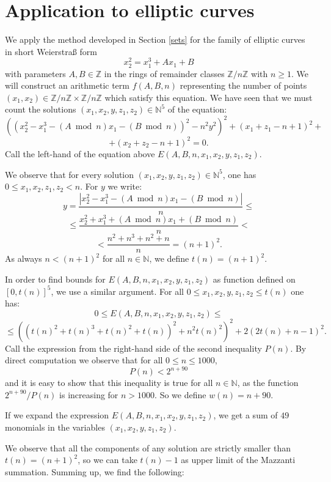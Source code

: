 \documentclass[10pt,a4paper]{article}
\theoremstyle{plain}
\begin{document}
\section{Application to elliptic curves} 

We apply the method developed in Section \ref{sets} for the family of elliptic curves in short Weierstra{\ss } form
$$x_2^2 = x_1^3 + Ax_1 + B$$
with parameters $A, B \in \mathbb Z$ in the rings of remainder classes $\mathbb Z / n \mathbb Z$ with $n \geq 1$. We will construct an arithmetic term $f(A, B, n)$ representing the number of points $(x_1,x_2) \in \mathbb Z / n \mathbb Z \times \mathbb Z / n \mathbb Z$ which satisfy this equation. We have seen that we must count the solutions $(x_1, x_2, y, z_1, z_2) \in \mathbb N^5$ of the equation:
$$\left ( \left (x_2^2 -  x_1^3 - (A \bmod n) x_1 - (B \bmod n) \right )^2 - n^2 y^2\right )^2 + (x_1 + z_1 - n + 1)^2 + $$ $$ + (x_2 + z_2 - n + 1)^2 = 0.$$
Call the left-hand of the equation above $E(A, B, n, x_1, x_2, y, z_1, z_2) $. 

We observe that for every solution $(x_1, x_2, y, z_1, z_2) \in \mathbb N^5$, one has $0 \leq x_1, x_2, z_1, z_2 < n$. For $y$ we write:
$$y = \frac{|x_2^2 - x_1^3 - (A \bmod n) x_1 - (B \bmod n)|}{n}\le $$ $$\le \frac{x_2^2 + x_1^3 + (A \bmod n) x_1 + (B \bmod n)}{n} <$$
$$< \frac{n^2 + n^3 + n^2 + n}{n} = (n+1)^2.$$
As always $n < (n+1)^2$ for all $n \in \mathbb N$, we define $t(n) = (n+1)^2$. 

In order to find bounds for $E(A, B, n, x_1, x_2, y, z_1, z_2) $ as function defined on $[0, t(n)]^5$, we use a similar argument. For all $0 \leq x_1, x_2, y, z_1, z_2 \leq t(n)$ one has:
$$0 \leq E(A, B, n, x_1, x_2, y, z_1, z_2) \leq$$ $$\leq 
\left ( (t(n)^2 + t(n)^3 + t(n)^2 + t(n))^2 + n^2 t(n)^2 \right )^2 + 2 (2 t(n) + n - 1)^2.$$
Call the expression from the right-hand side of the second inequality $P(n)$. By direct computation we observe that for all $0 \leq n \leq 1000$,
$$P(n) < 2^{n + 90}$$
and it is easy to show that this inequality is true for all $n \in \mathbb N$, as the function $2^{n+90} / P(n)$ is increasing for $n > 1000$. So we define $w(n) = n + 90$. 

If we expand the expression $E(A, B, n, x_1, x_2, y, z_1, z_2)$, we get a sum of $49$ monomials in the variables $(x_1, x_2, y, z_1, z_2)$.

We observe that all the components of any solution are strictly smaller than $t(n) = (n+1)^2$, so we can take $t(n) - 1$ as upper limit of the Mazzanti summation. Summing up, 
we find the following:
\end{document}
